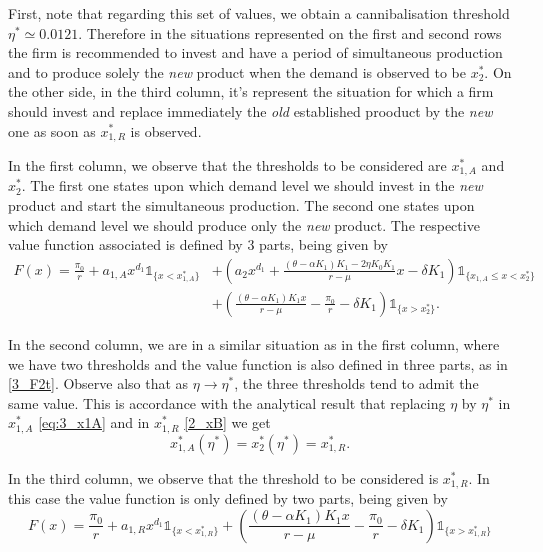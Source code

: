 First, note that regarding this set of values, we obtain a cannibalisation threshold $\eta^*\simeq 0.0121$. Therefore in the situations represented on the first and second rows the firm is recommended to 
invest and have a period of simultaneous production and to produce solely the \textit{new} product when the demand is observed to be $x^*_2$.
On the other side, in the third column, it's represent the situation for which a firm should invest and replace immediately the \textit{old} established prooduct by the \textit{new} one as soon as $x^*_{1,R}$ is observed.

In the first column, we observe that the thresholds to be considered are $x_{1,A}^*$ and $x_2^*$. The first one states upon which demand level we should invest in the \textit{new} product and start the simultaneous production. The second one states upon which demand level we should produce only the \textit{new} product. The respective value function associated is defined by 3 parts, being given by 
\begin{equation}
\begin{split}
F(x)=\frac{\pi_0}{r}+
	a_{1,A}x^{d_1}  \mathds{1}_{ \{x<x^*_{1,A} \}}&+
	\left( a_2x^{d_1}+\frac{(\theta-\alpha K_1)K_1-2 \eta K_0 K_1}{r-\mu} x - \delta K_1 \right)  \mathds{1}_{ \{ x_{1,A} \leq x < x_2^* \}}\\
	&+
	\left(  \frac{(\theta-\alpha K_1)K_1 x}{r-\mu} -\frac{\pi_0}{r} - \delta K_1 \right)   \mathds{1}_{ \{ x>x_2^*  \} }.
\end{split}
	\label{3_F2t}
\end{equation}	

In the second column, we are in a similar situation as in the first column, where we have two thresholds and the value function is also defined in three parts, as in \eqref{3_F2t}.
Observe also that as $\eta \to \eta^*$, the three thresholds tend to admit the same value. This is accordance with the analytical result that replacing $\eta$ by $\eta^*$ in $x^*_{1,A}$ \eqref{eq:3_x1A} and in $x^*_{1,R}$ \eqref{2_xB} we get
$$x^*_{1,A}(\eta^*)=x_2^*(\eta^*)=x^*_{1,R}.$$


In the third column, we observe that the threshold to be considered is $x_{1,R}^*$. In this case the value function is only defined by two parts, being given by
$$F(x)=\frac{\pi_0}{r}+
	a_{1,R}x^{d_1} \mathds{1}_{ \{ x<x_{1,R}^* \} }+
	\left(  \frac{(\theta-\alpha K_1)K_1 x}{r-\mu} -\frac{\pi_0}{r} - \delta K_1 \right)  \mathds{1}_{ \{ x>x_{1,R}^* \} }$$


